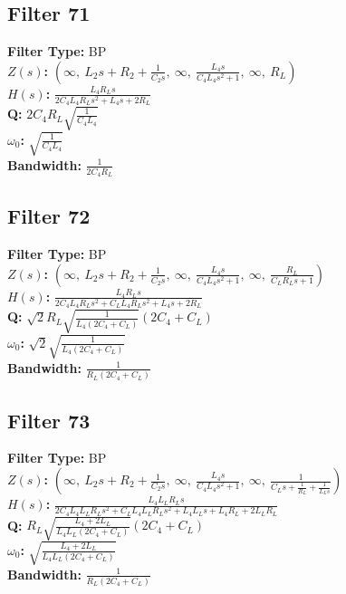 \documentclass{article}
\begin{document}
\subsection*{Filter 71}
\textbf{Filter Type:} BP \\ 
\textbf{$Z(s)$:} $\left( \infty, \  L_{2} s + R_{2} + \frac{1}{C_{2} s}, \  \infty, \  \frac{L_{4} s}{C_{4} L_{4} s^{2} + 1}, \  \infty, \  R_{L}\right)$ \\ 
\textbf{$H(s)$:} $\frac{L_{4} R_{L} s}{2 C_{4} L_{4} R_{L} s^{2} + L_{4} s + 2 R_{L}}$ \\ 
\textbf{Q:} $2 C_{4} R_{L} \sqrt{\frac{1}{C_{4} L_{4}}}$ \\ 
\textbf{$\omega_0$:} $\sqrt{\frac{1}{C_{4} L_{4}}}$ \\ 
\textbf{Bandwidth:} $\frac{1}{2 C_{4} R_{L}}$ \\ 
\subsection*{Filter 72}
\textbf{Filter Type:} BP \\ 
\textbf{$Z(s)$:} $\left( \infty, \  L_{2} s + R_{2} + \frac{1}{C_{2} s}, \  \infty, \  \frac{L_{4} s}{C_{4} L_{4} s^{2} + 1}, \  \infty, \  \frac{R_{L}}{C_{L} R_{L} s + 1}\right)$ \\ 
\textbf{$H(s)$:} $\frac{L_{4} R_{L} s}{2 C_{4} L_{4} R_{L} s^{2} + C_{L} L_{4} R_{L} s^{2} + L_{4} s + 2 R_{L}}$ \\ 
\textbf{Q:} $\sqrt{2} R_{L} \sqrt{\frac{1}{L_{4} \left(2 C_{4} + C_{L}\right)}} \left(2 C_{4} + C_{L}\right)$ \\ 
\textbf{$\omega_0$:} $\sqrt{2} \sqrt{\frac{1}{L_{4} \left(2 C_{4} + C_{L}\right)}}$ \\ 
\textbf{Bandwidth:} $\frac{1}{R_{L} \left(2 C_{4} + C_{L}\right)}$ \\ 
\subsection*{Filter 73}
\textbf{Filter Type:} BP \\ 
\textbf{$Z(s)$:} $\left( \infty, \  L_{2} s + R_{2} + \frac{1}{C_{2} s}, \  \infty, \  \frac{L_{4} s}{C_{4} L_{4} s^{2} + 1}, \  \infty, \  \frac{1}{C_{L} s + \frac{1}{R_{L}} + \frac{1}{L_{L} s}}\right)$ \\ 
\textbf{$H(s)$:} $\frac{L_{4} L_{L} R_{L} s}{2 C_{4} L_{4} L_{L} R_{L} s^{2} + C_{L} L_{4} L_{L} R_{L} s^{2} + L_{4} L_{L} s + L_{4} R_{L} + 2 L_{L} R_{L}}$ \\ 
\textbf{Q:} $R_{L} \sqrt{\frac{L_{4} + 2 L_{L}}{L_{4} L_{L} \left(2 C_{4} + C_{L}\right)}} \left(2 C_{4} + C_{L}\right)$ \\ 
\textbf{$\omega_0$:} $\sqrt{\frac{L_{4} + 2 L_{L}}{L_{4} L_{L} \left(2 C_{4} + C_{L}\right)}}$ \\ 
\textbf{Bandwidth:} $\frac{1}{R_{L} \left(2 C_{4} + C_{L}\right)}$ \\ 
\end{document}
